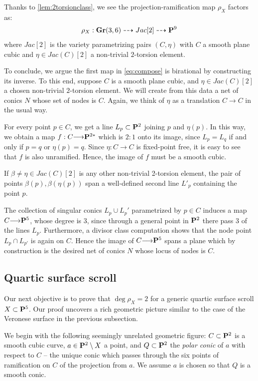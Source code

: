 \documentclass[11pt,reqno]{amsart}
\theoremstyle{plain}
\theoremstyle{definition}
\theoremstyle{remark}
\numberwithin{equation}{section}
\renewcommand{\to}{{\longrightarrow}}
\numberwithin{equation}{section}
\begin{document}
Thanks to \autoref{lem:2torsionclass}, we see the projection-ramification map $\rho_{X}$ factors as: 
\begin{align}\label{eq:compose}
  \rho_{X}: \Gr(3,6) \dashrightarrow Jac[2] \dashrightarrow \P^{9}
\end{align}
where $Jac[2]$ is the variety parametrizing pairs $(C,\eta)$ with $C$ a smooth plane cubic and $\eta \in Jac(C)[2]$ a non-trivial $2$-torsion element. 


To conclude, we argue the first map in \eqref{eq:compose} is birational by constructing its inverse.  To this end, suppose $C$ is a smooth plane cubic, and $\eta \in Jac(C)[2]$ a chosen non-trivial $2$-torsion element. We will create from this data a net of conics $N$ whose set of nodes is $C$. Again, we think of $\eta$ as a translation $C \to C$ in the usual way.

  For every point $p \in C$, we get a line $L_{p} \subset \P^{2}$ joining $p$ and $\eta(p)$. In this way, we obtain a map $f: C \to \P^{2*}$ which is $2:1$ onto its image, since $L_{p} = L_{q}$ if and only if $p=q$ or $\eta(p)=q$.  Since  $\eta:C \to C$ is fixed-point free, it is easy to see that $f$ is also unramified. Hence, the image of $f$ must be a smooth cubic. 

  If $\beta \neq \eta \in Jac(C)[2]$ is any other non-trivial 2-torsion element, the pair of points $\beta(p), \beta(\eta(p))$ span a well-defined second line $L'_{p}$ containing the point $p$.  

  The collection of singular conics $L_{p} \cup L_{p}'$ parametrized by $p \in C$ induces a map $C \to \P^{5}$, whose degree is $3$, since  through a general point in $\P^{2}$ there pass $3$ of the lines $L_{p}$.  Furthermore, a divisor class computation shows that the node point $L_{p} \cap L_{p'}$ is again on $C$. Hence the image of $C \to \P^{5}$ spans a plane which by construction is the desired net of conics $N$ whose locus of nodes is $C$.


\subsection{Quartic surface scroll} Our next objective is to prove that $ \deg \rho_{X} = 2$ for a generic quartic surface scroll $X \subset \P^{5}$.  Our proof uncovers a  rich geometric picture similar to the case of the Veronese surface in the previous subsection.  


We begin with the following seemingly unrelated geometric figure: $C \subset \P^{2}$ is a smooth cubic curve, $a \in \P^{2} \setminus X$ a point, and $Q \subset \P^{2}$ the {\sl polar conic} of $a$ with respect to $C$ -- the unique conic which passes through the six points of ramification on $C$ of the projection from $a$.   We assume $a$ is chosen so that $Q$ is a smooth conic. 
\end{document}
